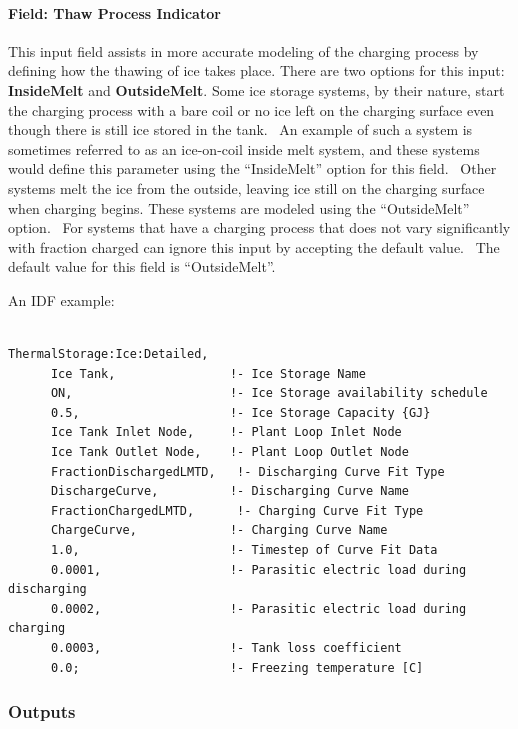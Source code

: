 \paragraph{Field: Thaw Process Indicator}\label{field-thaw-process-indicator}

This input field assists in more accurate modeling of the charging process by defining how the thawing of ice takes place. There are two options for this input: \textbf{InsideMelt} and \textbf{OutsideMelt}. Some ice storage systems, by their nature, start the charging process with a bare coil or no ice left on the charging surface even though there is still ice stored in the tank.~ An example of such a system is sometimes referred to as an ice-on-coil inside melt system, and these systems would define this parameter using the ``InsideMelt'' option for this field.~ Other systems melt the ice from the outside, leaving ice still on the charging surface when charging begins. These systems are modeled using the ``OutsideMelt'' option.~ For systems that have a charging process that does not vary significantly with fraction charged can ignore this input by accepting the default value.~ The default value for this field is ``OutsideMelt''.

An IDF example:

\begin{lstlisting}

ThermalStorage:Ice:Detailed,
      Ice Tank,                !- Ice Storage Name
      ON,                      !- Ice Storage availability schedule
      0.5,                     !- Ice Storage Capacity {GJ}
      Ice Tank Inlet Node,     !- Plant Loop Inlet Node
      Ice Tank Outlet Node,    !- Plant Loop Outlet Node
      FractionDischargedLMTD,   !- Discharging Curve Fit Type
      DischargeCurve,          !- Discharging Curve Name
      FractionChargedLMTD,      !- Charging Curve Fit Type
      ChargeCurve,             !- Charging Curve Name
      1.0,                     !- Timestep of Curve Fit Data
      0.0001,                  !- Parasitic electric load during discharging
      0.0002,                  !- Parasitic electric load during charging
      0.0003,                  !- Tank loss coefficient
      0.0;                     !- Freezing temperature [C]
\end{lstlisting}

\subsubsection{Outputs}\label{outputs-19-000}

